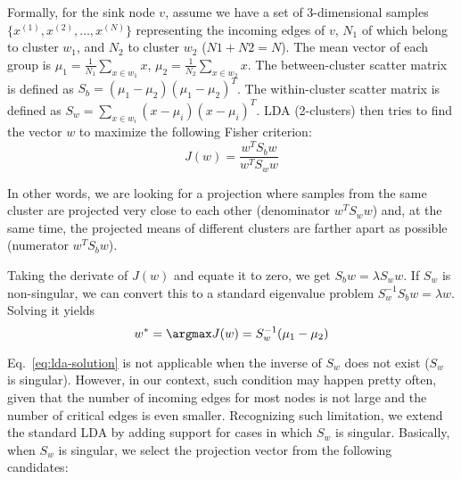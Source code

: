 Formally, for the sink node $v$, assume we have a set of 3-dimensional samples $\{x^{(1)}, x^{(2)}, \dots, x^{(N)}\}$ representing the incoming edges of $v$, $N_1$ of which belong to cluster $w_1$, and $N_2$ to cluster $w_2$ (\ie $N1 + N2 = N$).
The mean vector of each group is $\mu_1 = \frac{1}{N_1}\sum_{x\in w_1} x$, $\mu_2 = \frac{1}{N_2}\sum_{x\in w_2} x$. 
The between-cluster scatter matrix is defined as $S_b = (\mu_1 - \mu_2)(\mu_1 - \mu_2)^T$.
The within-cluster scatter matrix is defined as $S_w = \sum_{x\in w_i}(x-\mu_i)(x-\mu_i)^T$.
LDA (2-clusters) then tries to find the vector $w$ to maximize the following Fisher criterion:
\begin{equation}
    \label{eq:lda-objective}
    J(w) = \frac{w^TS_bw}{w^TS_ww}
\end{equation}

In other words, we are looking for a projection where samples from the same cluster are projected very close to each other (denominator $w^TS_ww$) and, at the same time, the projected means of different clusters are farther apart as possible (numerator $w^TS_bw$).

Taking the derivate of $J(w)$ and equate it to zero, we get $S_bw =\lambda S_ww$. If $S_w$ is non-singular, we can convert this to a standard eigenvalue problem $S_w^{-1}S_bw = \lambda w$. Solving it yields
\begin{equation}
    \label{eq:lda-solution}
    w^* = \argmax J(w) = S_w^{-1}(\mu_1-\mu_2)
\end{equation}

Eq.~\ref{eq:lda-solution} is not applicable when the inverse of $S_w$ does not exist (\ie $S_w$ is singular). 
However, in our context, such condition may happen pretty often, given that the number of incoming edges for most nodes is not large and the number of critical edges is even smaller.
Recognizing such limitation, we extend the standard LDA by adding support for cases in which $S_w$ is singular.
Basically, when $S_w$ is singular, we select the projection vector from the following candidates:

